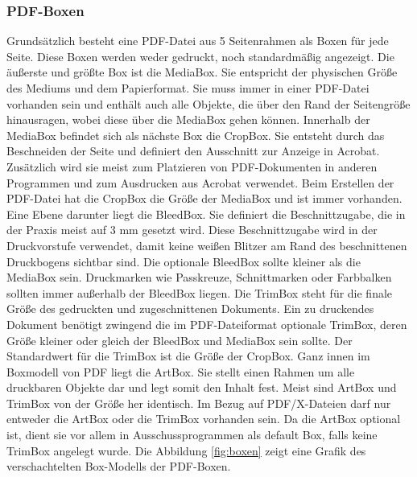 \subsubsection{PDF-Boxen}
Grundsätzlich besteht eine PDF-Datei aus 5 Seitenrahmen als Boxen für jede Seite. Diese Boxen werden weder gedruckt, noch standardmäßig angezeigt. Die äußerste und größte Box ist die MediaBox. Sie entspricht der physischen Größe des Mediums und dem Papierformat. Sie muss immer in einer PDF-Datei vorhanden sein und enthält auch alle Objekte, die über den Rand der Seitengröße hinausragen, wobei diese über die MediaBox gehen können. Innerhalb der MediaBox befindet sich als nächste Box die CropBox. Sie entsteht durch das Beschneiden der Seite und definiert den Ausschnitt zur Anzeige in Acrobat. Zusätzlich wird sie meist zum Platzieren von PDF-Dokumenten in anderen Programmen und zum Ausdrucken aus Acrobat verwendet. Beim Erstellen der PDF-Datei hat die CropBox die Größe der MediaBox und ist immer vorhanden. Eine Ebene darunter liegt die BleedBox. Sie definiert die Beschnittzugabe, die in der Praxis meist auf 3 mm gesetzt wird. Diese Beschnittzugabe wird in der Druckvorstufe verwendet, damit keine weißen Blitzer am Rand des beschnittenen Druckbogens sichtbar sind. Die optionale BleedBox sollte kleiner als die MediaBox sein. Druckmarken wie Passkreuze, Schnittmarken oder Farbbalken sollten immer außerhalb der BleedBox liegen. Die TrimBox steht für die finale Größe des gedruckten und zugeschnittenen Dokuments. Ein zu druckendes Dokument benötigt zwingend die im PDF-Dateiformat optionale TrimBox, deren Größe kleiner oder gleich der BleedBox und MediaBox sein sollte. Der Standardwert für die TrimBox ist die Größe der CropBox. Ganz innen im Boxmodell von PDF liegt die ArtBox. Sie stellt einen Rahmen um alle druckbaren Objekte dar und legt somit den Inhalt fest. Meist sind ArtBox und TrimBox von der Größe her identisch. Im Bezug auf PDF/X-Dateien darf nur entweder die ArtBox oder die TrimBox vorhanden sein. Da die ArtBox optional ist, dient sie vor allem in Ausschussprogrammen als default Box, falls keine TrimBox angelegt wurde. Die Abbildung \ref{fig:boxen} zeigt eine Grafik des verschachtelten Box-Modells der PDF-Boxen.

